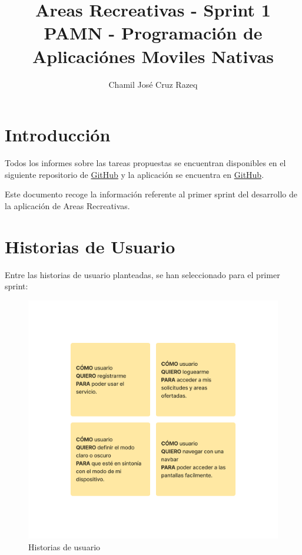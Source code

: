 \documentclass{article}
\title{Areas Recreativas - Sprint 1 \\[3ex] \small PAMN - Programación de Aplicaciónes Moviles Nativas}
\author{Chamil José Cruz Razeq}
\begin{document}
    \maketitle
    \thispagestyle{empty}
    \newpage

    \section{Introducción}
        Todos los informes sobre las tareas propuestas se encuentran disponibles en el
         siguiente repositorio de \href{https://github.com/chamilstudy/ulpgc_pamn_labs}{GitHub}
         y la aplicación se encuentra en \href{https://github.com/chamilstudy/pamn_proyecto_final}{GitHub}.

        Este documento recoge la información referente al primer sprint del desarrollo de la
         aplicación de Areas Recreativas.
    
    \section{Historias de Usuario}

    Entre las historias de usuario planteadas, se han seleccionado para el primer sprint:
    
    \begin{figure}[H]
        \centerline{\includegraphics[scale=0.4]{historias.png}}
        \caption{Historias de usuario}
        \label{fig:historias}
    \end{figure}
\end{document}
